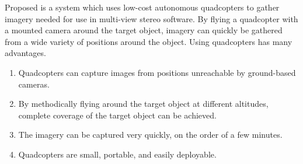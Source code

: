 Proposed is a system which uses low-cost autonomous quadcopters to gather imagery needed for use in multi-view stereo software. By flying a quadcopter with a mounted camera around the target object, imagery can quickly be gathered from a wide variety of positions around the object. Using quadcopters has many advantages.

\begin{enumerate}
\item
Quadcopters can capture images from positions unreachable by ground-based cameras.

\item
By methodically flying around the target object at different altitudes, complete coverage of the target object can be achieved.

\item
The imagery can be captured very quickly, on the order of a few minutes.

\item
Quadcopters are small, portable, and easily deployable.


\end{enumerate}

